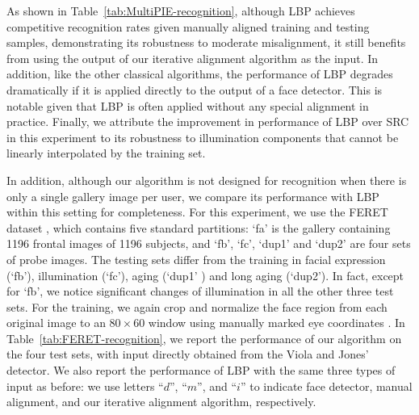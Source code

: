 As shown in Table~\ref{tab:MultiPIE-recognition}, although LBP
achieves competitive recognition rates given manually aligned
training and testing samples, demonstrating its robustness to
moderate misalignment, it still benefits from using the output
of our iterative alignment algorithm as the input. In addition,
like the other classical algorithms, the performance of LBP
degrades dramatically if it is applied directly to the output
of a face detector. This is notable given that LBP is often
applied without any special alignment in practice. Finally, we
attribute the improvement in performance of LBP over SRC in
this experiment to its robustness to illumination components
that cannot be linearly interpolated by the training set.

In addition, although our algorithm is not designed for
recognition when there is only a single gallery image per user,
we compare its performance with LBP within this setting for
completeness. For this experiment, we use the FERET dataset
\cite{phillips1998feret}, which contains five standard
partitions: `fa' is the gallery containing 1196 frontal images
of 1196 subjects, and `fb', `fc', `dup1' and `dup2' are four
sets of probe images. The testing sets differ from the training
in facial expression (`fb'), illumination (`fc'), aging (`dup1'
) and long aging (`dup2'). In fact, except for `fb', we notice
significant changes of illumination in all the other three test
sets. For the training, we again crop and normalize the face
region from each original image to an $80\times 60$ window
using manually marked eye coordinates \cite{Deng2010-PR}. In
Table~\ref{tab:FERET-recognition}, we report the performance of
our algorithm on the four test sets, with input directly
obtained from the Viola and Jones' detector. We also report the
performance of LBP with the same three types of input as before:
we use letters
``$d$'', ``$m$'', and ``$i$'' to indicate face detector, manual
alignment, and our iterative alignment algorithm, respectively.


